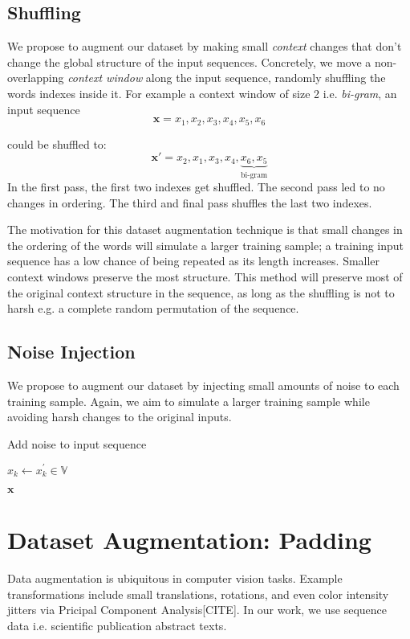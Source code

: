 \subsection{Shuffling}
We propose to augment our dataset by making small \textit{context} changes that don't change the global structure
of the input sequences. Concretely, we move a non-overlapping \textit{context window} along the input sequence, randomly
shuffling the words indexes inside it. For example a context window of size 2 i.e. \textit{bi-gram}, an input sequence
\[\bm{x} = x_1, x_2, x_3, x_4, x_5, x_6\]

 could be shuffled to:
\[\bm{x}\prime = x_2, x_1, x_3, x_4, \underbrace{x_6, x_5}_\text{bi-gram}\]
In the first pass, the first two indexes get shuffled. The second pass led to no changes in ordering. The third and
final pass shuffles the last two indexes.

The motivation for this dataset augmentation technique is that small changes in the ordering of the words will
simulate a larger training sample; a training input sequence has a low chance of being repeated as its
length increases. Smaller context windows preserve the most structure. This method will preserve
most of the original context structure in the sequence, as long as the shuffling is not to harsh e.g.
a complete random permutation of the sequence.

\subsection{Noise Injection}
We propose to augment our dataset by injecting small amounts of noise to each training sample. Again, we aim to simulate
a larger training sample while avoiding harsh changes to the original inputs.
\begin{algorithm}[H]
\caption{Add noise to input sequence}
\begin{algorithmic}[1]
\State$x_k \gets x^{\prime}_k \in \mathbb{V}$
\EndIf
\EndFor

\Return $\bm{x}$
\EndProcedure
\end{algorithmic}
\end{algorithm}


\section{Dataset Augmentation: Padding}
Data augmentation is ubiquitous in computer vision tasks. Example transformations include
small translations, rotations, and even color intensity jitters via Pricipal Component
Analysis[CITE]. In our work, we use sequence data i.e. scientific publication abstract texts.


